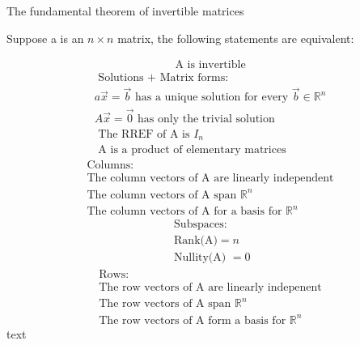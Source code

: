 The fundamental theorem of invertible matrices

Suppose a is an $n\times n$ matrix, the following statements are equivalent:

$$
\begin{align}
\text{ A is invertible }
\end{align}
$$
$$
\begin{align}
\text{ Solutions + Matrix forms: } \\
a\vec{x}=\vec{b} \text{ has a unique solution for every }\vec{b}\in \mathbb{R}^{n} \\
A\vec{x}=\vec{0} \text{ has only the trivial solution } \\
\text{ The RREF of A is }I_{n} \\
\text{ A is a product of elementary matrices }
\end{align}
$$
$$
\begin{align}
\text{ Columns: } \\
\text{ The column vectors of A are linearly independent } \\
\text{ The column vectors of A span }\mathbb{R}^{n} \\
\text{ The column vectors of A for a basis for } \mathbb{R}^{n}
\end{align}
$$
$$
\begin{align}
\text{ Subspaces: } \\
\text{ Rank(A)} =n \\
\text{ Nullity(A) }=0
\end{align}
$$
$$
\begin{align}
\text{ Rows: } \\
\text{ The row vectors of A are linearly indepenent } \\
\text{ The row vectors of A span } \mathbb{R}^{n} \\
\text{ The row vectors of A form a basis for } \mathbb{R}^{n}
\end{align}
$$
text
